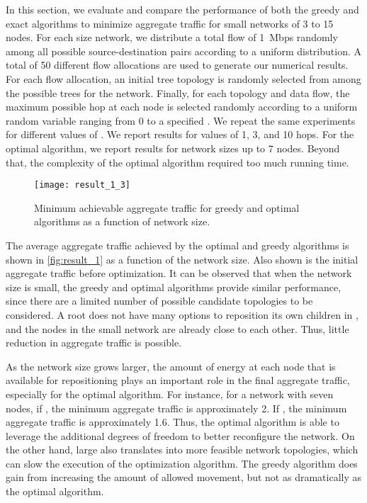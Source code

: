 \documentclass[10pt,conference]{IEEEtran}
\begin{document}
In this section, we evaluate and compare the performance of both the
greedy and exact algorithms to minimize aggregate traffic for small
networks of 3 to 15 nodes. For each size network, we distribute a
total flow of 1~Mbps randomly among all possible source-destination
pairs according to a uniform distribution.  A total of 50 different
flow allocations are used to generate our numerical results.  For each
flow allocation, an initial tree topology is randomly selected from
among the possible trees for the network.  Finally, for each topology
and data flow, the maximum possible hop  at each node is
selected randomly according to a uniform random variable ranging from
0 to a specified .  We repeat the same experiments for
different values of .  We report results for 
values of 1, 3, and 10 hops.  For the optimal algorithm, we report
results for network sizes up to 7 nodes.  Beyond that, the complexity
of the optimal algorithm required too much running time.


\begin{figure} \centering
 \texttt{[image: result\_1\_3]}
 \caption{Minimum achievable aggregate traffic for greedy and optimal
   algorithms as a function of network size.}
 \label{fig:result_1}
\end{figure}

The average aggregate traffic achieved by the optimal and greedy
algorithms is shown in \autoref{fig:result_1} as a function of the
network size.  Also shown is the initial aggregate traffic before
optimization.  It can be observed that when the network size is small,
the greedy and optimal algorithms provide similar performance, since
there are a limited number of possible candidate topologies
to be considered. A root does not have many options to reposition its own
children in , and the nodes in the small network are
already close to each other.   Thus, little reduction in aggregate
traffic is possible.

As the network size grows larger, the amount of energy at each node
that is available for repositioning plays an important role in the
final aggregate traffic, especially for the optimal algorithm.  For
instance, for a network with seven nodes, if , the minimum
aggregate traffic is approximately 2.  If , the minimum
aggregate traffic is approximately 1.6.  Thus, the optimal algorithm
is able to leverage the additional degrees of freedom to better
reconfigure the network.  On the other hand, large  also
translates into more feasible network topologies, which can slow the
execution of the optimization algorithm.  The greedy algorithm does gain
from increasing the amount of allowed movement, but not as dramatically as the
optimal algorithm.
\end{document}

